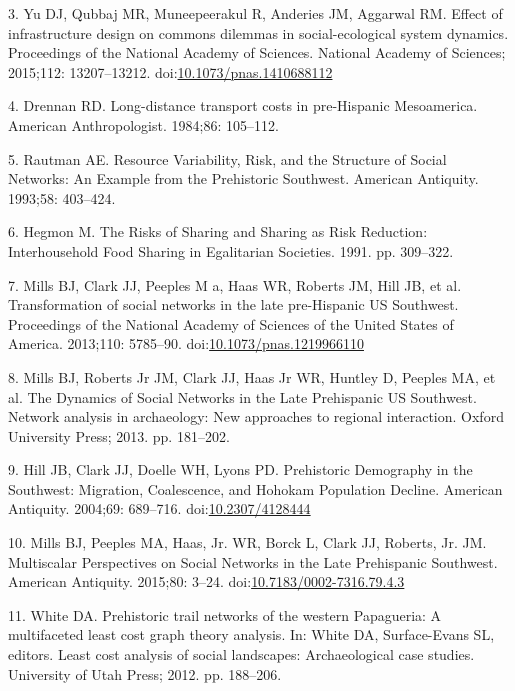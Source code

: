 \documentclass[10pt,letterpaper]{article}
\begin{document}
\hypertarget{ref-Yu2015}{}
3. Yu DJ, Qubbaj MR, Muneepeerakul R, Anderies JM, Aggarwal RM. Effect
of infrastructure design on commons dilemmas in social-ecological system
dynamics. Proceedings of the National Academy of Sciences. National
Academy of Sciences; 2015;112: 13207--13212.
doi:\href{https://doi.org/10.1073/pnas.1410688112}{10.1073/pnas.1410688112}

\hypertarget{ref-Drennan1984}{}
4. Drennan RD. Long-distance transport costs in pre-Hispanic
Mesoamerica. American Anthropologist. 1984;86: 105--112.

\hypertarget{ref-Rautman1993a}{}
5. Rautman AE. Resource Variability, Risk, and the Structure of Social
Networks: An Example from the Prehistoric Southwest. American Antiquity.
1993;58: 403--424.

\hypertarget{ref-Hegmon1991}{}
6. Hegmon M. The Risks of Sharing and Sharing as Risk Reduction:
Interhousehold Food Sharing in Egalitarian Societies. 1991. pp.
309--322.

\hypertarget{ref-Mills2013a}{}
7. Mills BJ, Clark JJ, Peeples M a, Haas WR, Roberts JM, Hill JB, et al.
Transformation of social networks in the late pre-Hispanic US Southwest.
Proceedings of the National Academy of Sciences of the United States of
America. 2013;110: 5785--90.
doi:\href{https://doi.org/10.1073/pnas.1219966110}{10.1073/pnas.1219966110}

\hypertarget{ref-Mills2012}{}
8. Mills BJ, Roberts Jr JM, Clark JJ, Haas Jr WR, Huntley D, Peeples MA,
et al. The Dynamics of Social Networks in the Late Prehispanic US
Southwest. Network analysis in archaeology: New approaches to regional
interaction. Oxford University Press; 2013. pp. 181--202.

\hypertarget{ref-Hill2004}{}
9. Hill JB, Clark JJ, Doelle WH, Lyons PD. Prehistoric Demography in the
Southwest: Migration, Coalescence, and Hohokam Population Decline.
American Antiquity. 2004;69: 689--716.
doi:\href{https://doi.org/10.2307/4128444}{10.2307/4128444}

\hypertarget{ref-Mills2015a}{}
10. Mills BJ, Peeples MA, Haas, Jr. WR, Borck L, Clark JJ, Roberts, Jr.
JM. Multiscalar Perspectives on Social Networks in the Late Prehispanic
Southwest. American Antiquity. 2015;80: 3--24.
doi:\href{https://doi.org/10.7183/0002-7316.79.4.3}{10.7183/0002-7316.79.4.3}

\hypertarget{ref-White2012}{}
11. White DA. Prehistoric trail networks of the western Papagueria: A
multifaceted least cost graph theory analysis. In: White DA,
Surface-Evans SL, editors. Least cost analysis of social landscapes:
Archaeological case studies. University of Utah Press; 2012. pp.
188--206.
\end{document}
